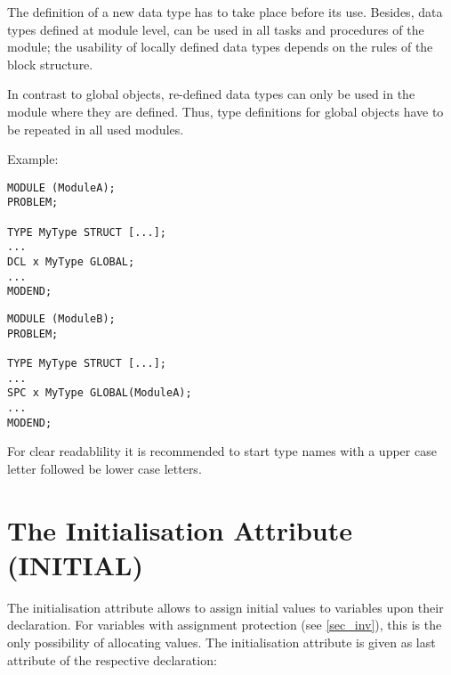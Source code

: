 \begin{grammarframe}
\end{grammarframe}

The definition of a new data type has to take place before its use.
Besides, data types defined at module level, can be used in all tasks
and procedures of the module; the usability of locally defined data
types depends on the rules of the block structure.

In contrast to global objects, re-defined data types can only be used
in the module where they are defined. Thus, type definitions for
global objects have to be repeated in all used modules.

\begin{minipage}{\linewidth}
Example:

\begin{multicols}{2}
\begin{lstlisting}
MODULE (ModuleA);
PROBLEM;   
             
TYPE MyType STRUCT [...];
...                
DCL x MyType GLOBAL;   
...           
MODEND;     
\end{lstlisting}

\columnbreak
\begin{lstlisting}
MODULE (ModuleB);
PROBLEM;        
           
TYPE MyType STRUCT [...];
...               
SPC x MyType GLOBAL(ModuleA);
...                
MODEND;     
\end{lstlisting}
\end{multicols}
\end{minipage}

For clear readablility it is recommended to start type names with a 
upper case letter followed be lower case letters.

\section{The Initialisation Attribute (INITIAL)}   %
\label{sec_init}

The initialisation attribute allows to assign initial values to
variables upon their declaration. For variables with assignment
protection (see \ref{sec_inv}), this is the only possibility of allocating
values. The initialisation attribute is given as last attribute of the
respective declaration:

\begin{grammarframe}
\end{grammarframe}

